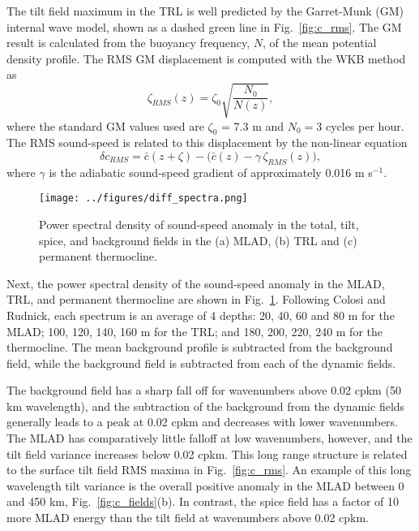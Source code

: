 \documentclass[preprint,NumberedRefs]{JASA}
\begin{document}
The tilt field maximum in the TRL is well predicted by the Garret-Munk (GM) internal wave model, shown as a dashed green line in Fig.~\ref{fig:c_rms}. The GM result is calculated from the buoyancy frequency, $N$, of the mean potential density profile. The RMS GM displacement is computed with the WKB method as
\begin{equation*}
    \zeta_{RMS}(z) = \zeta_0 \sqrt{\frac{N_0}{N(z)}},
\end{equation*}
where the standard GM values used are $\zeta_0$ = 7.3 m and $N_0=3$ cycles per hour.\cite{colosi2016sound} The RMS sound-speed is related to this displacement by the non-linear equation
\begin{equation*}
    \delta c_{RMS} = \bar{c}(z+\zeta)-\big(\bar{c}(z) - \gamma \, \zeta_{RMS}(z)\big),
\end{equation*}
where $\gamma$ is the adiabatic sound-speed gradient of approximately 0.016 m s$^{-1}$.

\begin{figure}
\texttt{[image: ../figures/diff\_spectra.png]}
        \caption{\label{fig:spectra}{Power spectral density of sound-speed anomaly in the total, tilt, spice, and background fields in the (a) MLAD, (b) TRL and (c) permanent thermocline.}}
\end{figure}
Next, the power spectral density of the sound-speed anomaly in the MLAD, TRL, and permanent thermocline are shown in Fig.~\ref{fig:spectra}. Following Colosi and Rudnick,\cite{colosi2020observations} each spectrum is an average of 4 depths: 20, 40, 60 and 80 m for the MLAD; 100, 120, 140, 160 m for the TRL; and 180, 200, 220, 240 m for the thermocline. The mean background profile is subtracted from the background field, while the background field is subtracted from each of the dynamic fields.

The background field has a sharp fall off for wavenumbers above 0.02 cpkm (50 km wavelength), and the subtraction of the background from the dynamic fields generally leads to a peak at 0.02 cpkm and decreases with lower wavenumbers. The MLAD has comparatively little falloff at low wavenumbers, however, and the tilt field variance increases below 0.02 cpkm. This long range structure is related to the surface tilt field RMS maxima in Fig.~\ref{fig:c_rms}. An example of this long wavelength tilt variance is the overall positive anomaly in the MLAD between 0 and 450 km, Fig.~\ref{fig:c_fields}(b). In contrast, the spice field has a factor of 10 more MLAD energy than the tilt field at wavenumbers above 0.02 cpkm.
\end{document}
